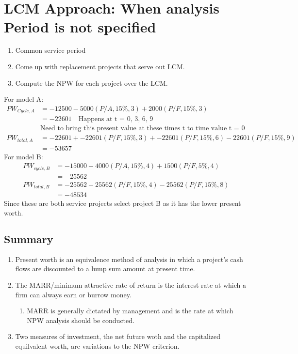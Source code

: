 \documentclass{report} %
\begin{document}
\section*{LCM Approach: When analysis Period is not specified}
\begin{enumerate}
    \item Common service period
    \item Come up with replacement projects that serve out LCM.
    \item Compute the NPW for each project over the LCM.
\end{enumerate}
For model A:
\begin{equation*}
    \begin{aligned}
        PW_{Cycle,A} &= -12500 - 5000(P/A,15\%,3) + 2000(P/F,15\%,3) \\
                    &= -22601 \quad \text{Happens at t = 0, 3, 6, 9} \\
                    & \text{Need to bring this present value at these times t to time value t = 0} \\
        PW_{total,A} &= -22601 + -22601(P/F,15\%,3) + -22601(P/F,15\%,6) -22601(P/F,15\%,9) \\
                    &= -53657
    \end{aligned}
\end{equation*} 
For model B:
\begin{equation*}
    \begin{aligned}
        PW_{cycle,B} &= -15000 - 4000(P/A,15\%,4) + 1500(P/F,5\%,4) \\
                    &= -25562 \\
        PW_{total,B} &= -25562 - 25562(P/F,15\%,4) - 25562(P/F,15\%,8) \\
                    &= -48534 
    \end{aligned}
\end{equation*}
Since these are both service projects select project B as it has the lower present worth.

\subsection*{Summary}
\begin{enumerate}
    \item Present worth is an equivalence method of analysis in which a project's cash flows are discounted to a lump sum amount at present time.
    \item The MARR/minimum attractive rate of return is the interest rate at which a firm can always earn or burrow money.
        \begin{enumerate}
            \item MARR is generally dictated by management and is the rate at which NPW analysis should be conducted.
        \end{enumerate}
    \item Two measures of investment, the net future woth and the capitalized equilvalent worth, are variations to the NPW criterion.
\end{enumerate}
\end{document}
